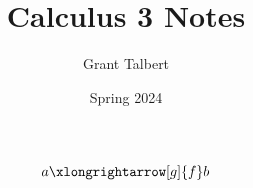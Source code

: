 \documentclass[12pt, letterpaper]{report}
\title{Calculus 3 Notes}
\author{Grant Talbert}
\date{Spring 2024}
\begin{document}
	\maketitle
	
	\begin{abstract}
	\end{abstract}
	
	\newpage
	
	\tableofcontents
	
	\newpage


\[
	a\xlongrightarrow[g]{f}b
\]
\end{document}
